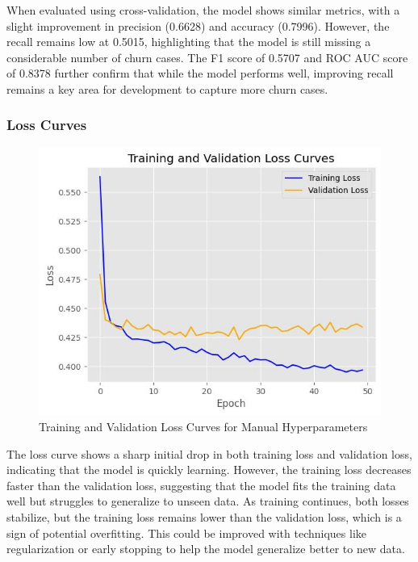 When evaluated using cross-validation, the model shows similar metrics, with a slight improvement in precision (0.6628) and accuracy (0.7996). However, the recall remains low at 0.5015, highlighting that the model is still missing a considerable number of churn cases. The F1 score of 0.5707 and ROC AUC score of 0.8378 further confirm that while the model performs well, improving recall remains a key area for development to capture more churn cases.

\subsubsection{Loss Curves}

\begin{figure}[hbt!]
    \centering
    \includegraphics[width=1\linewidth]{Images/5.5.2.a.jpg}
    \caption{Training and Validation Loss Curves for Manual Hyperparameters}
    \label{fig:enter-label}
\end{figure}

The loss curve shows a sharp initial drop in both training loss and validation loss, indicating that the model is quickly learning. However, the training loss decreases faster than the validation loss, suggesting that the model fits the training data well but struggles to generalize to unseen data. As training continues, both losses stabilize, but the training loss remains lower than the validation loss, which is a sign of potential overfitting. This could be improved with techniques like regularization or early stopping to help the model generalize better to new data.


